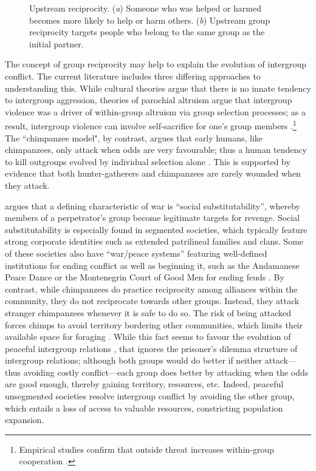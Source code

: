 \documentclass[12pt,a4paper]{article}\usepackage[]{graphicx}\usepackage[]{color}
\begin{document}
\begin{figure}
\begin{center}
\begin{subfigure}[b]{0.4\textwidth}
            \caption{}\label{group}
        \end{subfigure}
        \caption{Upstream reciprocity. (\textit{a}) Someone who was helped or harmed becomes more likely to help or harm others. (\textit{b})
    Upstream group reciprocity targets people who belong to
    the same group as the initial partner.}
        \label{fig:illustration}
	\end{center}
\end{figure}

The concept of group reciprocity may help to explain the evolution of intergroup conflict. The current literature 
includes three differing approaches to understanding this. While cultural theories argue that there is no innate tendency to 
intergroup aggression, theories of parochial altruism argue that intergroup violence was a driver of within-group 
altruism via group selection processes; as a result, intergroup violence can involve self-sacrifice for one's group
members \citep{choi2007coevolution,bowles2009did,hugh2013reputation}.\footnote{
Empirical studies confirm that outside threat increases within-group cooperation \citep{weisel2016social,gneezy2012conflict,bornstein1994}.
} 
The ``chimpanzee model", by contrast, argues that early humans, like
chimpanzees, only attack when odds are very favourable; thus a human tendency to kill outgroups evolved by individual
selection alone \citep{wrangham2012intergroup}. This is supported by evidence that both 
hunter-gatherers and chimpanzees are rarely wounded when they attack. 

\citet{kelly2000warless} argues that a defining characteristic of war is ``social substitutability'', whereby members 
of a perpetrator's group become legitimate targets for revenge. Social substitutability is especially found in segmented
societies, which typically feature strong corporate identities such as extended patrilineal families and clans. 
Some of these societies also have ``war/peace systems'' featuring well-defined institutions for ending conflict as well as beginning it, such as the Andamanese Peace Dance or the Montenegrin Court of Good Men for ending feuds 
\citep{boehm1984blood}. By 
contrast, while chimpanzees do practice reciprocity among alliances within the community, they  do not 
reciprocate towards other groups. Instead, they attack stranger chimpanzees whenever it is safe to do so. The risk of 
being attacked forces chimps to avoid territory bordering other communities, which limits their available space for foraging 
\citep{wilson2003intergroup}. 
While this fact seems to favour the evolution of peaceful intergroup relations 
\citep{kelly2005evolution}, that ignores the prisoner's dilemma structure of intergroup relations; although both groups would
do better if neither attack---thus avoiding costly conflict---each group does better by attacking when the odds are good enough, thereby gaining territory, resources, etc. Indeed, peaceful unsegmented societies resolve intergroup conflict by avoiding the other group, which entails a loss of access to valuable
resources, constricting population expansion. 
\end{document}
